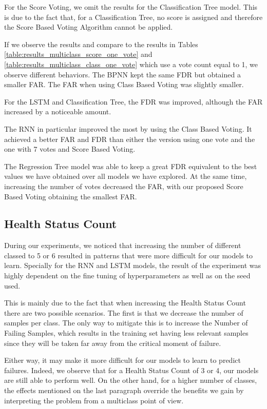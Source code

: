 For the Score Voting, we omit the results for the Classification Tree model.
This is due to the fact that, for a Classification Tree, no score is assigned and therefore the Score Based Voting Algorithm cannot be applied.

If we observe the results and compare to the results in Tables \ref{table:results_multiclass_score_one_vote} and \ref{table:results_multiclass_class_one_vote} which use a vote count equal to 1, we observe different behaviors.
The BPNN kept the same FDR but obtained a smaller FAR.
The FAR when using Class Based Voting was slightly smaller.

For the LSTM and Classification Tree, the FDR was improved, although the FAR increased by a noticeable amount.

The RNN in particular improved the most by using the Class Based Voting.
It achieved a better FAR and FDR than either the version using one vote and the one with 7 votes and Score Based Voting.

The Regression Tree model was able to keep a great FDR equivalent to the best values we have obtained over all models we have explored.
At the same time, increasing the number of votes decreased the FAR, with our proposed Score Based Voting obtaining the smallest FAR.

\subsection{Health Status Count}

During our experiments, we noticed that increasing the number of different classed to 5 or 6 resulted in patterns that were more difficult for our models to learn.
Specially for the RNN and LSTM models, the result of the experiment was highly dependent on the fine tuning of hyperparameters as well as on the seed used.

This is mainly due to the fact that when increasing the Health Status Count there are two possible scenarios.
The first is that we decrease the number of samples per class.
The only way to mitigate this is to increase the Number of Failing Samples, which results in the training set having less relevant samples since they will be taken far away from the critical moment of failure.

Either way, it may make it more difficult for our models to learn to predict failures.
Indeed, we observe that for a Health Status Count of 3 or 4, our models are still able to perform well.
On the other hand,  for a higher number of classes, the effects mentioned on the last paragraph override the benefits we gain by interpreting the problem from a multiclass point of view.

